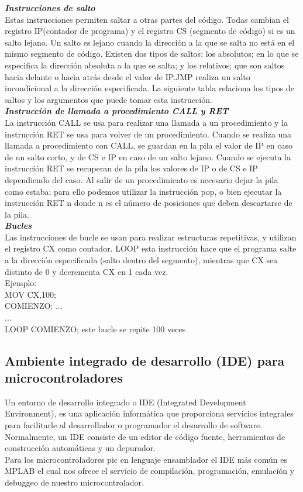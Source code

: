\documentclass[12pt,a4paper]{article}
\begin{document}
  \textbf{\textit{Instrucciones de salto}}\\
  Estas instrucciones permiten saltar a otras partes del código. Todas cambian el registro IP(contador de programa) y el registro CS (segmento de código) si es un salto lejano. Un salto es lejano cuando la dirección a la que se salta no está en el mismo segmento de código. Existen dos tipos de saltos: los absolutos; en lo que se especifica la dirección absoluta a la que se salta; y los relativos; que son saltos hacia delante o hacia atrás desde el valor de IP.JMP realiza un salto incondicional a la dirección especificada. La siguiente tabla relaciona los tipos de saltos y los argumentos que puede tomar esta instrucción.\\
   
   \textbf{\textit{Instrucción de llamada a procedimiento CALL y RET}}\\
   La instrucción CALL se usa para realizar una llamada a un procedimiento y la instrucción RET se usa para volver de un procedimiento. Cuando se realiza una llamada a procedimiento con CALL, se guardan en la pila el valor de IP en caso de un salto corto, y de CS e IP en caso de un salto lejano. Cuando se ejecuta la instrucción RET se recuperan de la pila los valores de IP o de CS e IP dependiendo del caso. Al salir de un procedimiento es necesario dejar la pila como estaba; para ello podemos utilizar la instrucción pop, o bien ejecutar la instrucción RET n donde n es el número de posiciones que deben descartarse de la pila.\\
   
   \textbf{\textit{Bucles}}\\
   Las instrucciones de bucle se usan para realizar estructuras repetitivas, y utilizan el registro CX como contador. LOOP esta instrucción hace que el programa salte a la dirección especificada (salto dentro del segmento), mientras que CX sea distinto de 0 y decrementa CX en 1 cada vez. \\
   Ejemplo:\\
  MOV CX,100;\\
  COMIENZO: ...\\
  ...\\
  LOOP COMIENZO; este bucle se repite 100 veces
   
\subsection{Ambiente integrado de desarrollo (IDE) para microcontroladores}   
   Un entorno de desarrollo integrado o IDE (Integrated Development Environment), es una aplicación informática que proporciona servicios integrales para facilitarle al desarrollador o programador el desarrollo de software. Normalmente, un IDE consiste de un editor de código fuente, herramientas de construcción automáticas y un depurador.\\
   Para los microcontroladores pic en lenguaje ensamblador el IDE más común es MPLAB el cual nos ofrece el servicio de compilación, programación, emulación y debuggeo de nuestro microcontrolador.
   
\end{document}
